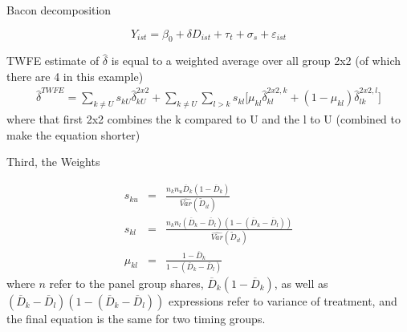 \documentclass{beamer}
\begin{document}
	

\begin{frame}{Bacon decomposition}

$$Y_{ist} = \beta_0 + \delta D_{ist} + \tau_t + \sigma_s + \varepsilon_{ist}$$


TWFE estimate of $\widehat{\delta}$ is equal to a weighted average over all group 2x2 (of which there are 4 in this example)
\begin{eqnarray*}	
\widehat{\delta}^{TWFE} = \sum_{k \neq U} s_{kU}\widehat{\delta}_{kU}^{2x2} + \sum_{k \neq U} \sum_{l>k} s_{kl}  \bigg [ \mu_{kl}\widehat{\delta}_{kl}^{2x2,k} + (1-\mu_{kl}) \widehat{\delta}_{lk}^{2x2,l} \bigg]
\end{eqnarray*}where that first 2x2 combines the k compared to U and the l to U (combined to make the equation shorter)

\end{frame}
	


\begin{frame}{Third, the Weights}

 \begin{eqnarray*} s_{ku} &=& \frac{ n_k n_u \overline{D}_k (1- \overline{D}_k ) }{ \widehat{Var} ( \tilde{D}_{it} )} \\
s_{kl} &=& \frac{ n_k n_l (\overline{D}_k - \overline{D}_{l} ) ( 1- ( \overline{D}_k - \overline{D}_{l} )) }{\widehat{Var}(\tilde{D}_{it})} \\
\mu_{kl} &=& \frac{1 - \overline{D}_k }{1 - ( \overline{D}_k - \overline{D}_{l} )}
\end{eqnarray*}where $n$ refer to the panel group shares, $\overline{D}_k (1- \overline{D}_k )$, as well as $(\overline{D}_k - \overline{D}_{l} ) ( 1- ( \overline{D}_k - \overline{D}_{l} ))$ expressions refer to variance of treatment, and the final equation is the same for two timing groups.

\end{frame}
\end{document}
